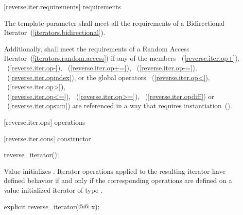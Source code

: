 \begin{codeblock}
  template <@@>
    reverse_iterator<@@> make_reverse_iterator(@@ i);
}@\added{\}\}\newtxt{\}}}@
\end{codeblock}

\begin{removedblock}
[reverse.iter.requirements]{ requirements}

\pnum
The template parameter
shall meet all the requirements of a Bidirectional Iterator~(\ref{iterators.bidirectional}).

\pnum
Additionally,
shall meet the requirements of a Random Access Iterator~(\ref{iterators.random.access})
if any of the members
~(\ref{reverse.iter.op+}),
~(\ref{reverse.iter.op-}),
~(\ref{reverse.iter.op+=}),
~(\ref{reverse.iter.op-=}),
~(\ref{reverse.iter.opindex}),
or the global operators
~(\ref{reverse.iter.op<}),
~(\ref{reverse.iter.op>}),\\
~(\ref{reverse.iter.op<=}),
~(\ref{reverse.iter.op>=}),
~(\ref{reverse.iter.opdiff})
or
~(\ref{reverse.iter.opsum})
are referenced in a way that requires instantiation~().
\end{removedblock}

[reverse.iter.ops]{ operations}

[reverse.iter.cons]{ constructor}

%
\begin{itemdecl}
reverse_iterator();
\end{itemdecl}

\begin{itemdescr}
\pnum
\effects
Value initializes
.
Iterator operations applied to the resulting iterator have defined behavior
if and only if the corresponding operations are defined on a
value-initialized iterator of type
.
\end{itemdescr}

%

\begin{itemdecl}
explicit reverse_iterator(@@ x);
\end{itemdecl}

